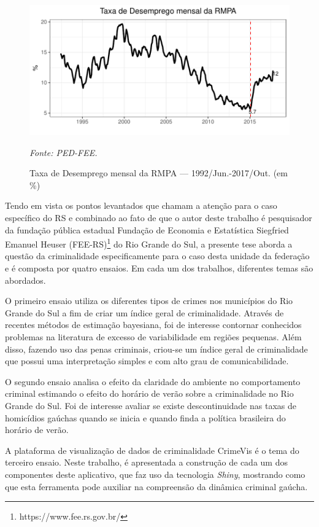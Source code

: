 \documentclass[12pt,openright,oneside,a4paper,english,french,spanish]{abntex2}
\numberwithin{table}{section} %
\numberwithin{figure}{section} %
\newcommand{\source}[1]{\textit{#1}}
\begin{document}
\begin{figure}[H]
\begin{center}
\includegraphics{TESE_DE_DOUTORADO_RENAN_FINAL-plot_desem_introducao}
\end{center}
\caption{Taxa de Desemprego mensal da RMPA — 1992/Jun.-2017/Out. (em \%)}
\source{Fonte: PED-FEE.}
\label{fig:desem_int}
\end{figure}

Tendo em vista os pontos levantados que chamam a atenção para o caso específico do RS e combinado ao fato de que o autor deste trabalho é pesquisador da fundação pública estadual Fundação de Economia e Estatística Siegfried Emanuel Heuser (FEE-RS)\footnote{https://www.fee.rs.gov.br/} do Rio Grande do Sul, a presente tese aborda a questão da criminalidade especificamente para o caso desta unidade da federação e é composta por quatro ensaios. Em cada um dos trabalhos, diferentes temas são abordados. 

O primeiro ensaio utiliza os diferentes tipos de crimes nos municípios do Rio Grande do Sul a fim de criar um índice geral de criminalidade. Através de recentes métodos de estimação bayesiana, foi de interesse contornar conhecidos problemas na literatura de excesso de variabilidade em regiões pequenas. Além disso, fazendo uso das penas criminais, criou-se um índice geral de criminalidade que possui uma interpretação simples e com alto grau de comunicabilidade.

O segundo ensaio analisa o efeito da claridade do ambiente no comportamento criminal estimando o efeito do horário de verão sobre a criminalidade no Rio Grande do Sul. Foi de interesse avaliar se existe descontinuidade nas taxas de homicídios gaúchas quando se inicia e quando finda a política brasileira do horário de verão.

A plataforma de visualização de dados de criminalidade CrimeVis é o tema do terceiro ensaio. Neste trabalho, é apresentada a construção de cada um dos componentes deste aplicativo, que faz uso da tecnologia \textit{Shiny}, mostrando como que esta ferramenta pode auxiliar na compreensão da dinâmica criminal gaúcha.
\end{document}
